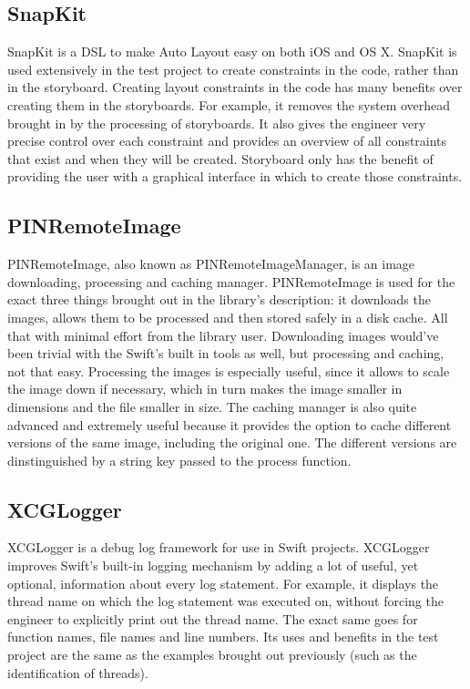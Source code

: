\documentclass[a4paper,12pt]{article}
\begin{document}
\subsection{SnapKit}
SnapKit is a DSL to make Auto Layout easy on both iOS and OS X.\cite{SnapKit} SnapKit is used extensively in the test
project to create constraints in the code, rather than in the storyboard. Creating layout constraints in the code has
many benefits over creating them in the storyboards. For example, it removes the system overhead brought in by the
processing of storyboards. It also gives the engineer very precise control over each constraint and provides an overview
of all constraints that exist and when they will be created. Storyboard only has the benefit of providing the user with
a graphical interface in which to create those constraints.

\subsection{PINRemoteImage}
PINRemoteImage, also known as PINRemoteImageManager, is an image downloading, processing and caching manager.\cite{PINRemoteImage}
PINRemoteImage is used for the exact three things brought out in the library's description: it downloads the images,
allows them to be processed and then stored safely in a disk cache. All that with minimal
effort from the library user. Downloading images would've been trivial with the Swift's built in tools as well, but
processing and caching, not that easy. Processing the images is especially useful, since it allows to scale the image
down if necessary, which in turn makes the image smaller in dimensions and the file smaller in size. The caching
manager is also quite advanced and extremely useful because it provides the option to cache different versions of
the same image, including the original one. The different versions are dinstinguished by a string key passed to
the process function.

\subsection{XCGLogger}
XCGLogger is a debug log framework for use in Swift projects.\cite{XCGLogger} XCGLogger improves Swift's built-in
logging mechanism by adding a lot of useful, yet optional, information about every log statement. For example, it
displays the thread name on which the log statement was executed on, without forcing the engineer to explicitly print
out the thread name. The exact same goes for function names, file names and line numbers. Its uses and benefits in the
test project are the same as the examples brought out previously (such as the identification of threads).
\end{document}
